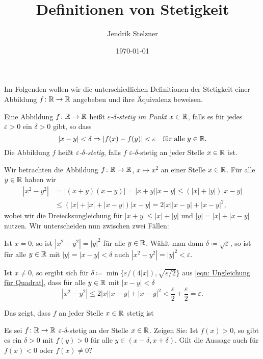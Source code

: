 \documentclass[a4paper,10pt]{article}
\title{Definitionen von Stetigkeit}
\author{Jendrik Stelzner}
\date{\today}
\begin{document}
\maketitle


Im Folgenden wollen wir die unterschiedlichen Definitionen der Stetigkeit einer Abbildung $f \colon \mathbb{R} \to \mathbb{R}$ angebeben und ihre Äquivalenz beweisen.


\begin{defi}
 Eine Abbildung $f \colon \mathbb{R} \to \mathbb{R}$ heißt \emph{$\varepsilon$-$\delta$-stetig im Punkt $x \in \mathbb{R}$}, falls es für jedes $\varepsilon > 0$ ein $\delta > 0$ gibt, so dass
 \[
  |x-y| < \delta \Rightarrow |f(x)-f(y)| < \varepsilon \quad \text{für alle $y \in \mathbb{R}$}.
 \]
 Die Abbildung $f$ heißt \emph{$\varepsilon$-$\delta$-stetig}, falls $f$ $\varepsilon$-$\delta$-stetig an jeder Stelle $x \in \mathbb{R}$ ist.
\end{defi}

\begin{bsp}
 Wir betrachten die Abbildung $f \colon \mathbb{R} \to \mathbb{R}$, $x \mapsto x^2$ an einer Stelle $x \in \mathbb{R}$. Für alle $y \in \mathbb{R}$ haben wir
 \begin{equation}\label{eqn: Ungleichung für Quadrat}
  \begin{aligned}
   \left| x^2 - y^2 \right|
   &= |(x+y)(x-y)|
   = |x+y||x-y|
   \leq (|x|+|y|)|x-y| \\
   &\leq (|x|+|x|+|x-y|)|x-y|
   = 2|x||x-y| + |x-y|^2,
  \end{aligned}
 \end{equation}
 wobei wir die Dreiecksungleichung für \mbox{$|x+y| \leq |x| + |y|$} und \mbox{$|y| = |x| + |x-y|$} nutzen. Wir unterscheiden nun zwischen zwei Fällen:
 
 Ist $x = 0$, so ist $|x^2 - y^2| = |y|^2$ für alle $y \in \mathbb{R}$. Wählt man dann $\delta \coloneqq \sqrt{\varepsilon}$, so ist für alle $y \in \mathbb{R}$ mit $|y| = |x-y| < \delta$ auch $|x^2-y^2| = |y|^2 < \varepsilon$.
 
 Ist $x \neq 0$, so ergibt sich für $\delta \coloneqq \min\{ \varepsilon/(4|x|), \sqrt{\varepsilon/2} \}$ aus \eqref{eqn: Ungleichung für Quadrat}, dass für alle $y \in \mathbb{R}$ mit $|x-y| < \delta$
 \[
  \left| x^2 - y^2 \right| \leq 2|x||x-y| + |x-y|^2 < \frac{\varepsilon}{2} + \frac{\varepsilon}{2} = \varepsilon.
 \]
 
 Das zeigt, dass $f$ an jeder Stelle $x \in \mathbb{R}$ stetig ist
\end{bsp}


\begin{question}
 Es sei $f \colon \mathbb{R} \to \mathbb{R}$ $\varepsilon$-$\delta$-stetig an der Stelle $x \in \mathbb{R}$. Zeigen Sie: Ist $f(x) > 0$, so gibt es ein $\delta > 0$ mit $f(y) > 0$ für alle $y \in (x-\delta, x+\delta)$. Gilt die Aussage auch für $f(x) < 0$ oder $f(x) \neq 0$?
\end{question}
\end{document}
